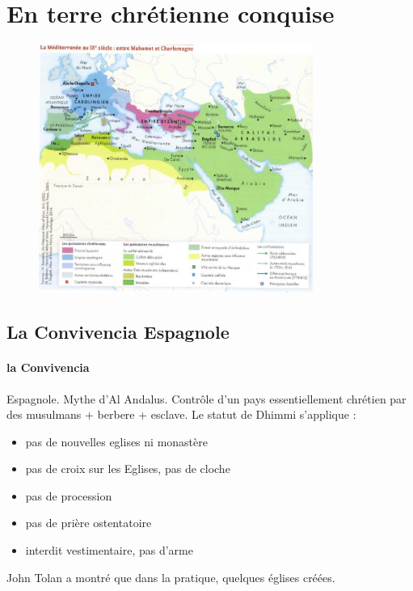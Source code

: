 \section{En terre chrétienne conquise}
\begin{figure}
    \centering
\includegraphics[width=0.8\textwidth]{HistoireIslamMediterranee/Images/MedIXe.png}
    \label{fig:my_label}
\end{figure}

 
\subsection{La Convivencia Espagnole}
\paragraph{la Convivencia} Espagnole. Mythe d'Al Andalus. Contrôle d'un pays essentiellement chrétien par des musulmans + berbere + esclave. Le statut de Dhimmi s'applique : 
\begin{itemize}
    \item pas de nouvelles eglises ni monastère
    \item pas de croix sur les Eglises, pas de cloche
    \item pas de procession
    \item pas de prière ostentatoire
    \item interdit vestimentaire, pas d'arme
\end{itemize}

John Tolan a montré que dans la pratique, quelques églises créées.

